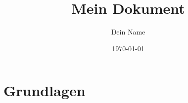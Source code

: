\documentclass{book}
\begin{document}
\title{Mein Dokument}
\author{Dein Name}
\date{\today}
\maketitle

\chapter{Grundlagen}





\end{document}
